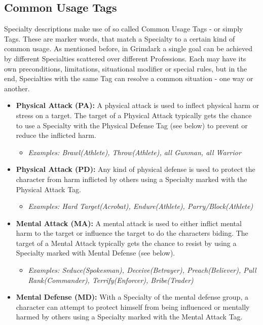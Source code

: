 \subsection{Common Usage Tags}\label{Tags}
Specialty descriptions make use of so called Common Usage Tags - or simply Tags. 
These are marker words, that match a Specialty to a certain kind of common usage.
As mentioned before, in Grimdark a single goal can be achieved by different Specialties scattered over different Professions.
Each may have its own preconditions, limitations, situational modifier or special rules, but in the end, Specialties with the same Tag can resolve a common situation - one way or another.
\begin{itemize}
	\item \textbf{Physical Attack (PA):} A physical attack is used to inflect physical harm or stress on a target. The target of a Physical Attack typically gets the chance to use a Specialty with the Physical Defense Tag (see below) to prevent or reduce the inflicted harm.
	\begin{itemize}
		\item \textit{Examples: Brawl(Athlete), Throw(Athlete), all Gunman, all Warrior}
	\end{itemize}
	\item \textbf{Physical Attack (PD):} Any kind of physical defense is used to protect the character from harm inflicted by others using a Specialty marked with the Physical Attack Tag.
	\begin{itemize}
		\item \textit{Examples: Hard Target(Acrobat), Endure(Athlete), Parry/Block(Athlete)}
	\end{itemize}
	\item \textbf{Mental Attack (MA):} A mental attack is used to either inflict mental harm to the target or influence the target to do the characters biding. The target of a Mental Attack typically gets the chance to resist by using a Specialty marked with Mental Defense (see below).
	\begin{itemize}
		\item \textit{Examples: Seduce(Spokesman), Deceive(Betrayer), Preach(Believer), Pull Rank(Commander), Terrify(Enforcer), Bribe(Trader)}
	\end{itemize}
	\item \textbf{Mental Defense (MD):} With a Specialty of the mental defense group, a character can attempt to protect himself from being influenced or mentally harmed by others using a Specialty marked with the Mental Attack Tag.

\end{itemize}
